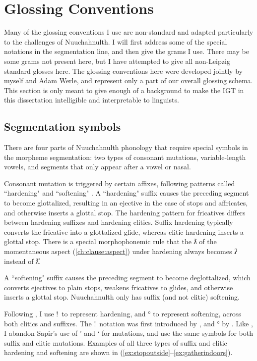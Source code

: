 \chapter{Glossing Conventions}

Many of the glossing conventions I use are non-standard and adapted particularly to the challenges of Nuuchahnulth. I will first address some of the special notations in the segmentation line, and then give the grams I use. There may be some grams not present here, but I have attempted to give all non-Leipzig standard glosses \cite{leipzig} here. The glossing conventions here were developed jointly by myself and Adam Werle, and represent only a part of our overall glossing schema. This section is only meant to give enough of a background to make the IGT in this dissertation intelligible and interpretable to linguists.

\section{Segmentation symbols}

There are four parts of Nuuchahnulth phonology that require special symbols in the morpheme segmentation: two types of consonant mutations, variable-length vowels, and segments that only appear after a vowel or nasal.

Consonant mutation is triggered by certain affixes, following patterns called ``hardening" and ``softening" \citep{werle2010}. A ``hardening" suffix causes the preceding segment to become glottalized, resulting in an ejective in the case of stops and affricates, and otherwise inserts a glottal stop. The hardening pattern for fricatives differs between hardening suffixes and hardening clitics. Suffix hardening typically converts the fricative into a glottalized glide, whereas clitic hardening inserts a glottal stop. There is a special morphophonemic rule that the \textit{ƛ} of the momentaneous aspect (\ref{ch:clause:aspect}) under hardening always becomes \textit{ʔ} instead of \textit{ƛ̓}.

A ``softening" suffix causes the preceding segment to become deglottalized, which converts ejectives to plain stops, weakens fricatives to glides, and otherwise inserts a glottal stop. Nuuchahnulth only has suffix (and not clitic) softening.

Following \cite{werle2010}, I use !\ to represent hardening, and ° to represent softening, across both clitics and suffixes. The !\ notation was first introduced by \cite{boas1947}, and ° by \cite{jacobsen1996}. Like \citeauthor{werle2010}, I abandon Sapir's use of ' and ` for mutations, and use the same symbols for both suffix and clitic mutations. Examples of all three types of suffix and clitic hardening and softening are shown in (\ref{ex:stopoutside}--\ref{ex:gatherindoors}).

